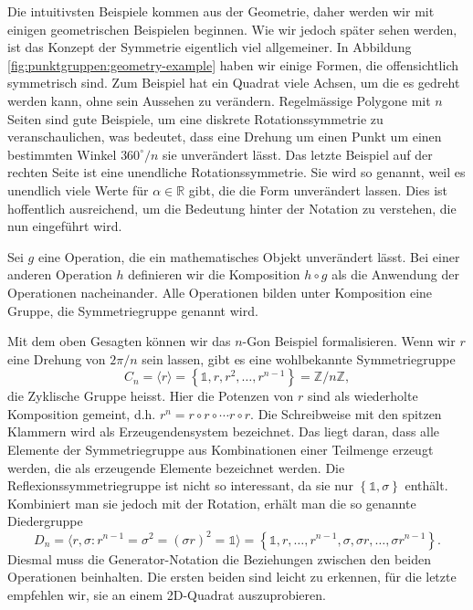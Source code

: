 Die intuitivsten Beispiele kommen aus der Geometrie, daher werden wir mit
einigen geometrischen Beispielen beginnen. Wie wir jedoch später sehen werden,
ist das Konzept der Symmetrie eigentlich viel allgemeiner.  In Abbildung
\ref{fig:punktgruppen:geometry-example} haben wir einige Formen, die
offensichtlich symmetrisch sind.  Zum Beispiel hat ein Quadrat viele Achsen, um
die es gedreht werden kann, ohne sein Aussehen zu verändern.  Regelmässige
Polygone mit \(n\) Seiten sind gute Beispiele, um eine diskrete
Rotationssymmetrie zu veranschaulichen, was bedeutet, dass eine Drehung um
einen Punkt um einen bestimmten Winkel \(360^\circ/n\) sie unverändert lässt.
Das letzte Beispiel auf der rechten Seite ist eine unendliche
Rotationssymmetrie. Sie wird so genannt, weil es unendlich viele Werte für
\(\alpha \in \mathbb{R}\) gibt, die die Form unverändert lassen.  Dies ist
hoffentlich ausreichend, um die Bedeutung hinter der Notation zu verstehen, die
nun eingeführt wird.

\begin{definition}[Symmetriegruppe]
	Sei \(g\) eine Operation, die ein mathematisches Objekt unverändert lässt.
	Bei einer anderen Operation \(h\) definieren wir die Komposition \(h\circ g\)
	als die Anwendung der Operationen nacheinander. Alle Operationen bilden unter
	Komposition eine Gruppe, die Symmetriegruppe genannt wird.
\end{definition}

Mit dem oben Gesagten können wir das \(n\)-Gon Beispiel formalisieren. Wenn wir
\(r\) eine Drehung von \(2\pi/n\) sein lassen, gibt es eine wohlbekannte Symmetriegruppe
\[
	C_n = \langle r \rangle
		= \left\{\mathds{1}, r, r^2, \ldots, r^{n-1}\right\}
		= \mathbb{Z}/n\mathbb{Z},
\]
die Zyklische Gruppe heisst. Hier die Potenzen von \(r\) sind als wiederholte
Komposition gemeint, d.h. \(r^n = r\circ r \circ \cdots r\circ r\).  Die
Schreibweise mit den spitzen Klammern wird als Erzeugendensystem bezeichnet.
Das liegt daran, dass alle Elemente der Symmetriegruppe aus Kombinationen einer
Teilmenge erzeugt werden, die als erzeugende Elemente bezeichnet werden.  Die
Reflexionssymmetriegruppe ist nicht so interessant, da sie nur
\(\left\{\mathds{1}, \sigma\right\}\) enthält. Kombiniert man sie jedoch mit
der Rotation, erhält man die so genannte Diedergruppe
\[
	D_n = \langle r, \sigma : r^{n-1} = \sigma^2 = (\sigma r)^2 = \mathds{1} \rangle
		= \left\{
				\mathds{1}, r, \ldots, r^{n-1}, \sigma, \sigma r, \ldots, \sigma r^{n-1}
		\right\}.
\]
Diesmal muss die Generator-Notation die Beziehungen zwischen den beiden
Operationen beinhalten. Die ersten beiden sind leicht zu erkennen, für die
letzte empfehlen wir, sie an einem 2D-Quadrat auszuprobieren.

